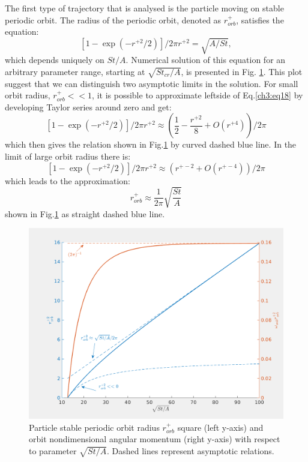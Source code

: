 \documentclass[../main.tex]{subfiles}
\begin{document}
The first type of trajectory that is analysed is the particle moving on stable periodic orbit. The radius of the periodic orbit, denoted as $r^+_{orb}$, satisfies the equation:
\begin{equation}
 \left[1-\exp\left( -r^{+ 2}/2 \right) \right]/2 \pi r^{+ 2}=\sqrt{A/St}, 
\label{ch3:eq18}
\end{equation}
which depends uniquely on $St/A$. Numerical solution of this equation for an arbitrary parameter range, starting at $\sqrt{St_{cr}/A}$, is presented in Fig. \ref{fig:ch3_3}. This plot suggest that we can distinguish two asymptotic limits in the solution. For small orbit radius, $r^+_{orb}<<1$, it is possible to approximate leftside of Eq.\ref{ch3:eq18} by developing Taylor series around zero and get:
\begin{equation}
 \left[1-\exp\left( -r^{+ 2}/2 \right) \right]/2 \pi r^{+ 2}\approx \left(\frac{1}{2}-\frac{r^{+ 2}}{8}+O(r^{+ 4})\right)/2 \pi
\label{ch3:eq18a}
\end{equation}
which then gives the relation shown in Fig.\ref{fig:ch3_3} by curved dashed blue line. In the limit of large orbit radius there is:
\begin{equation}
 \left[1-\exp\left( -r^{+ 2}/2 \right) \right]/2 \pi r^{+ 2}\approx \left(r^{+ -2}+O(r^{+ -4})\right) /2 \pi
\label{ch3:eq18b}
\end{equation}
which leads to the approximation:
\begin{equation}
r^+_{orb} \approx \frac{1}{2\pi} \sqrt{\frac{St}{A}}
\label{ch3:eq18c}
\end{equation}
shown in Fig.\ref{fig:ch3_3} as straight dashed blue line.

\begin{figure}
\centering
\noindent \includegraphics[width=30pc]{gfx/r0_2_sqrt_St_A_omega_r0_2.png}
\caption{Particle stable periodic orbit radius $r^+_{orb}$ square (left y-axis) and orbit nondimensional angular momentum (right y-axis) with respect to parameter $\sqrt{St/A}$. Dashed lines represent asymptotic relations.}
\label{fig:ch3_3}
\end{figure}
\end{document}
